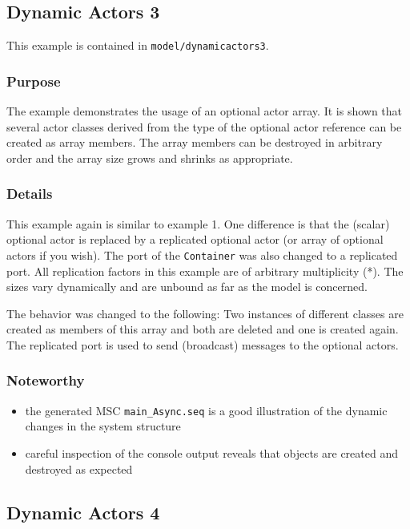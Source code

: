 \subsection{Dynamic Actors 3}

This example is contained in \texttt{model/dynamicactors3}.

\subsubsection{Purpose}

The example demonstrates the usage of an optional actor array. It is shown that several actor classes
derived from the type of the optional actor reference can be created as array members.
The array members can be destroyed in arbitrary order and the array size grows and shrinks as appropriate.

\subsubsection{Details}

This example again is similar to example 1. One difference is that the (scalar) optional actor is replaced by a
replicated optional actor (or array of optional actors if you wish).
The port of the \texttt{Container} was also changed to a replicated port. All replication factors in this example
are of arbitrary multiplicity (*). The sizes vary dynamically and are unbound as far as the model is concerned.

The behavior was changed to the following:
Two instances of different classes are created as members of this array and both are deleted and one is created again.
The replicated port is used to send (broadcast) messages to the optional actors.

\subsubsection{Noteworthy}

\begin{itemize}
\item the generated MSC \texttt{main\_Async.seq} is a good illustration of the dynamic changes in the system structure
\item careful inspection of the console output reveals that objects are created and destroyed as expected
\end{itemize}

\subsection{Dynamic Actors 4}

